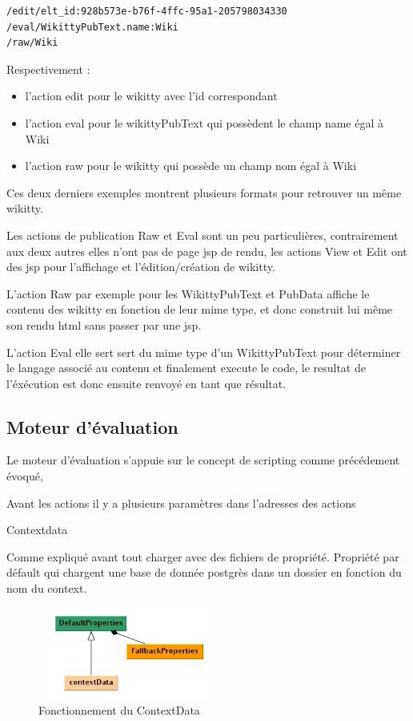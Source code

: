 \begin{verbatim}
/edit/elt_id:928b573e-b76f-4ffc-95a1-205798034330 
/eval/WikittyPubText.name:Wiki
/raw/Wiki
\end{verbatim}


Respectivement :
\begin{itemize}
\item l'action edit pour le wikitty avec l'id correspondant
\item l'action eval pour le wikittyPubText qui possèdent le champ name égal à
Wiki
\item l'action raw pour le wikitty qui possède un champ nom égal à Wiki
\end{itemize}

Ces deux derniers exemples montrent plusieurs formats pour retrouver un même
wikitty. 

Les actions de publication Raw et Eval sont un peu particulières, contrairement
aux deux autres elles n'ont pas de page jsp de rendu, les actions View et Edit
ont des jsp pour l'affichage et l'édition/création de wikitty.

L'action Raw par exemple pour les WikittyPubText et PubData affiche le contenu
des wikitty en fonction de leur mime type, et donc construit lui même son rendu
html sans passer par une jsp.

L'action Eval elle sert sert du mime type d'un WikittyPubText pour déterminer le
langage associé au contenu et finalement execute le code, le resultat de
l'éxécution est donc ensuite renvoyé en tant que résultat.

\subsection{Moteur d'évaluation}

Le moteur d'évaluation s'appuie sur le concept de scripting comme précédement 
évoqué, 

Avant les actions il y a plusieurs paramètres dans l'adresses des actions


Contextdata

Comme expliqué avant tout charger avec des fichiers de propriété.
Propriété par défault qui chargent une base de donnée postgrès 
dans un dossier en fonction du nom du context.

\begin{figure}[!ht]
\centering
\includegraphics[height=3cm,width=6cm]{image/propertiescontext.png}
  		\caption{Fonctionnement du ContextData}
  		\label{propertiescontext}
\end{figure}



